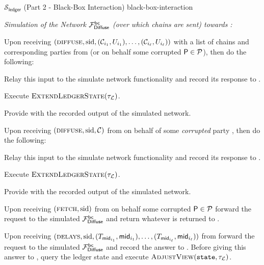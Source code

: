 \begin{simulatorbox}
    {$\mathcal{S}_{\mathsf{ledger}}$ (Part 2 - Black-Box Interaction)}
    {black-box-interaction}

    \newcommand*{\msgid}{\mathEnv{\mathsf{mid}}}

    \emph{Simulation of the Network $\mathcal{F}_{\mathsf{Diffuse}}^{\mathsf{bc}}$ (over which chains are sent) towards \adv:}
    \begin{cccItemize}[nosep]
        \item Upon receiving $(\textsc{diffuse}, \mathrm{sid}, (\mathcal{C}_{i_1}, U_{i_1}), \ldots, (\mathcal{C}_{i_\ell}, U_{i_\ell}))$ with a list of chains and corresponding parties from \adv (or on behalf some corrupted $\mathsf{P} \in \mathcal{P}$), then do the following:
        \begin{cccEnum}[nosep]
            \item Relay this input to the simulate network functionality and record its response to \adv.
            \item Execute $\textsc{ExtendLedgerState}(\tau_\mathcal{L})$.
            \item Provide \adv with the recorded output of the simulated network.
        \end{cccEnum}

        \item Upon receiving $(\textsc{diffuse}, \mathrm{sid}, \mathcal{C})$ from \adv on behalf of some \emph{corrupted} party \party, then do the following:
        \begin{cccEnum}[nosep]
            \item Relay this input to the simulate network functionality and record its response to \adv.
            \item Execute $\textsc{ExtendLedgerState}(\tau_\mathcal{L})$.
            \item Provide \adv with the recorded output of the simulated network.
        \end{cccEnum}

        \item Upon receiving $(\textsc{fetch}, \mathrm{sid})$ from \adv on behalf some corrupted $\mathsf{P} \in \mathcal{P}$ forward the request to the simulated $\mathcal{F}_{\mathsf{Diffuse}}^{\mathsf{bc}}$ and return whatever is returned to \adv.

        \item Upon receiving $(\textsc{delays}, \sid, (T_{\msgid_{i_1}}, \msgid_{i_1}), \ldots, (T_{\msgid_{i_\ell}}, \msgid_{i_\ell}))$ from \adv forward the request to the simulated $\mathcal{F}_{\mathsf{Diffuse}}^{\mathsf{bc}}$ and record the answer to \adv.
        Before giving this answer to \adv, query the ledger state \state and execute $\textsc{AdjustView}(\mathtt{state}, \tau_\mathcal{L})$.


\end{cccItemize}
\end{simulatorbox}
